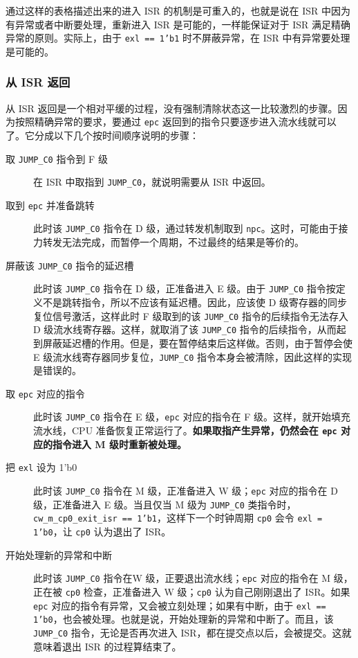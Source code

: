 \documentclass[12pt,AutoFakeBold,AutoFakeSlant]{article}
\newcommand{\ms}[1]{\texttt{#1}}
\begin{document}
通过这样的表格描述出来的进入 ISR 的机制是可重入的，也就是说在 ISR 中因为有异常或者中断要处理，重新进入 ISR 是可能的，一样能保证对于 ISR 满足精确异常的原则。实际上，由于 \ms{exl == 1'b1} 时不屏蔽异常，在 ISR 中有异常要处理是可能的。

\subsubsection{从 ISR 返回}

从 ISR 返回是一个相对平缓的过程，没有强制清除状态这一比较激烈的步骤。因为按照精确异常的要求，要通过 \ms{epc} 返回到的指令只要逐步进入流水线就可以了。它分成以下几个按时间顺序说明的步骤：

\begin{description}
\item[取 \ms{JUMP\_C0} 指令到 F 级]
在 ISR 中取指到 \ms{JUMP\_C0}，就说明需要从 ISR 中返回。
\item[取到 \ms{epc} 并准备跳转]
此时该 \ms{JUMP\_C0} 指令在 D 级，通过转发机制取到 \ms{npc}。这时，可能由于接力转发无法完成，而暂停一个周期，不过最终的结果是等价的。
\item[屏蔽该 \ms{JUMP\_C0} 指令的延迟槽]
此时该 \ms{JUMP\_C0} 指令在 D 级，正准备进入 E 级。由于 \ms{JUMP\_C0} 指令按定义不是跳转指令，所以不应该有延迟槽。因此，应该使 D 级寄存器的同步复位信号激活，这样此时 F 级取到的该 \ms{JUMP\_C0} 指令的后续指令无法存入 D 级流水线寄存器。这样，就取消了该 \ms{JUMP\_C0} 指令的后续指令，从而起到屏蔽延迟槽的作用。但是，要在暂停结束后这样做。否则，由于暂停会使 E 级流水线寄存器同步复位，\ms{JUMP\_C0} 指令本身会被清除，因此这样的实现是错误的。
\item[取 \ms{epc} 对应的指令]
此时该 \ms{JUMP\_C0} 指令在 E 级，\ms{epc} 对应的指令在 F 级。这样，就开始填充流水线，CPU 准备恢复正常运行了。\textbf{如果取指产生异常，仍然会在 \ms{epc} 对应的指令进入 M 级时重新被处理。}
\item[把 \ms{exl} 设为 1'b0]
此时该 \ms{JUMP\_C0} 指令在 M 级，正准备进入 W 级；\ms{epc} 对应的指令在 D 级，正准备进入 E 级。当且仅当 M 级为 \ms{JUMP\_C0} 类指令时，\ms{cw\_m\_cp0\_exit\_isr == 1'b1}，这样下一个时钟周期 \ms{cp0} 会令 \ms{exl = 1'b0}，让 \ms{cp0} 认为退出了 ISR。
\item[开始处理新的异常和中断]
此时该 \ms{JUMP\_C0} 指令在W 级，正要退出流水线；\ms{epc} 对应的指令在 M 级，正在被 \ms{cp0} 检查，正准备进入 W 级；\ms{cp0} 认为自己刚刚退出了 ISR。如果 \ms{epc} 对应的指令有异常，又会被立刻处理；如果有中断，由于 \ms{exl == 1'b0}，也会被处理。也就是说，开始处理新的异常和中断了。而且，该 \ms{JUMP\_C0} 指令，无论是否再次进入 ISR，都在提交点以后，会被提交。这就意味着退出 ISR 的过程算结束了。
\end{description}
\end{document}
